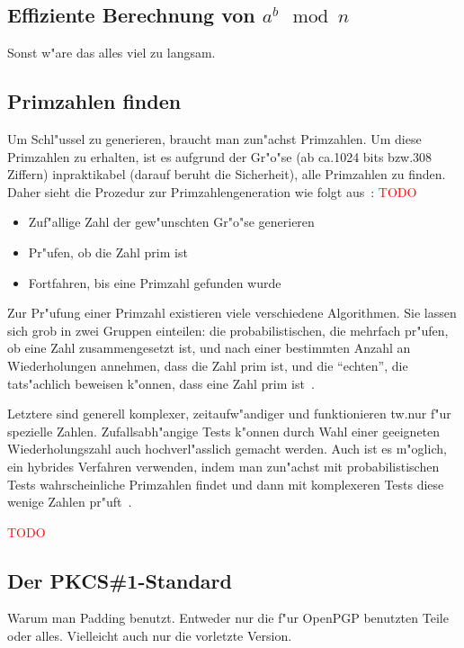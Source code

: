 \documentclass[12pt]{article}
\newcommand{\todo}[1]{\textcolor{red}{\mbox{TODO}}\marginpar{\textcolor{red}{#1}}}
\begin{document}
\subsection{Effiziente Berechnung von $a^b \mod n$}
Sonst w"are das alles viel zu langsam.
\subsection{Primzahlen finden}
Um Schl"ussel zu generieren, braucht man zun"achst Primzahlen.
Um diese Primzahlen zu erhalten, ist es aufgrund der Gr"o"se
(ab ca.\@ 1024 bits bzw.\@ 308 Ziffern)
inpraktikabel (darauf beruht die Sicherheit), alle Primzahlen zu finden.
Daher sieht die Prozedur zur Primzahlengeneration wie folgt aus~\cite{hac}: \todo{Fast 1 zu 1 "ubersetzt. Anders formatieren?}
\begin{itemize}
    \item Zuf"allige Zahl der gew"unschten Gr"o"se generieren
    \item Pr"ufen, ob die Zahl prim ist
    \item Fortfahren, bis eine Primzahl gefunden wurde
\end{itemize}

Zur Pr"ufung einer Primzahl existieren viele verschiedene Algorithmen.
Sie lassen sich grob in zwei Gruppen einteilen:
die probabilistischen, die mehrfach pr"ufen, ob eine Zahl zusammengesetzt ist,
und nach einer bestimmten Anzahl an Wiederholungen annehmen, dass die Zahl prim ist,
und die "`echten"', die tats"achlich beweisen k"onnen, dass eine Zahl prim ist~\cite{hac}.

Letztere sind generell komplexer, zeitaufw"andiger und funktionieren tw.\@ nur
f"ur spezielle Zahlen.
Zufallsabh"angige Tests k"onnen durch Wahl einer geeigneten Wiederholungszahl
auch hochverl"asslich gemacht werden.
Auch ist es m"oglich, ein hybrides Verfahren verwenden,
indem man zun"achst mit probabilistischen Tests
wahrscheinliche Primzahlen findet und dann mit komplexeren Tests
diese wenige Zahlen pr"uft~\cite{hac}.

\todo{Auch erkl"aren, welchen ich verwende?}

\subsection{Der PKCS\#1-Standard}
Warum man Padding benutzt. Entweder nur die f"ur OpenPGP benutzten Teile oder alles. Vielleicht auch nur die vorletzte Version.
\end{document}
